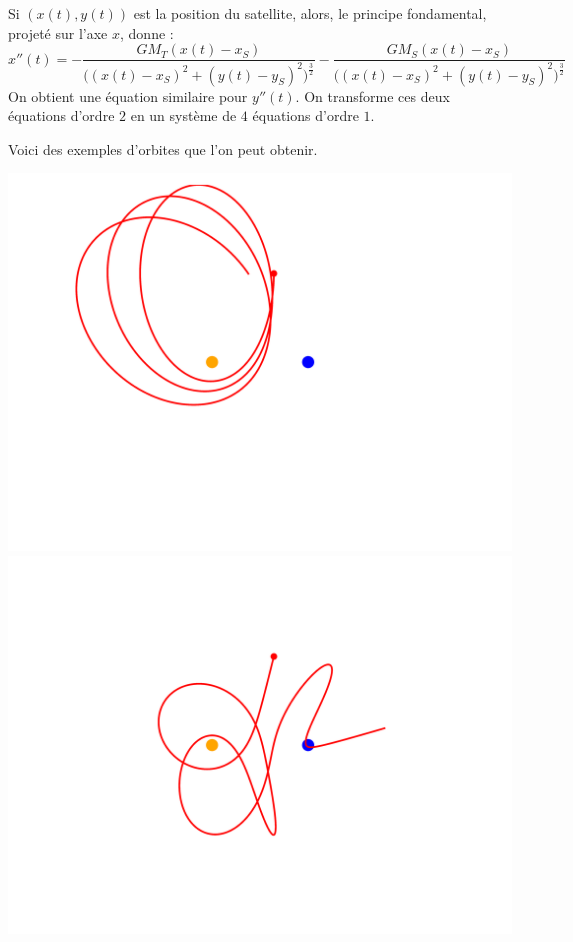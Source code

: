 \documentclass[11pt,class=report,crop=false]{standalone}
\begin{document}
Si $(x(t), y(t))$ est la position du satellite, alors, le principe fondamental, projeté sur l'axe $x$, donne :
$$x''(t) 
= - \frac{G M_T(x(t)-x_S)}{\big((x(t)-x_S)^2 + (y(t)-y_S)^2\big)^{\frac32}}
- \frac{G M_S(x(t)-x_S)}{\big((x(t)-x_S)^2 + (y(t)-y_S)^2\big)^{\frac32}}$$
On obtient une équation similaire pour $y''(t)$.
On transforme ces deux équations d'ordre $2$ en un système de $4$ équations d'ordre $1$.

Voici des exemples d'orbites que l'on peut obtenir.

\begin{center}
  \includegraphics[scale=\myscale,scale=0.7,trim={1cm 3.5cm 5cm 0},clip]{figures/satellite-01.png}
  \quad
  \includegraphics[scale=\myscale,scale=0.7,trim={2cm 2cm 2cm 3cm},clip]{figures/satellite-02.png}
\end{center}
\end{document}
